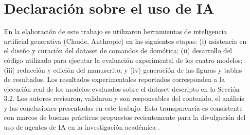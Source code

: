 \section*{Declaración sobre el uso de IA}

En la elaboración de este trabajo se utilizaron herramientas de
inteligencia artificial generativa (Claude, Anthropic) en las siguientes
etapas: (i) asistencia en el diseño y curación del dataset de comandos de
domótica; (ii) desarrollo del código utilizado para ejecutar la evaluación
experimental de los cuatro modelos; (iii) redacción y edición del
manuscrito; y (iv) generación de las figuras y tablas de resultados. Los
resultados experimentales reportados corresponden a la ejecución real de
los modelos evaluados sobre el dataset descripto en la Sección 3.2. Los
autores revisaron, validaron y son responsables del contenido, el análisis
y las conclusiones presentadas en este trabajo. Esta transparencia es
consistente con marcos de buenas prácticas propuestos recientemente para la
divulgación del uso de agentes de IA en la investigación académica
\cite{torassa2025etica}.
